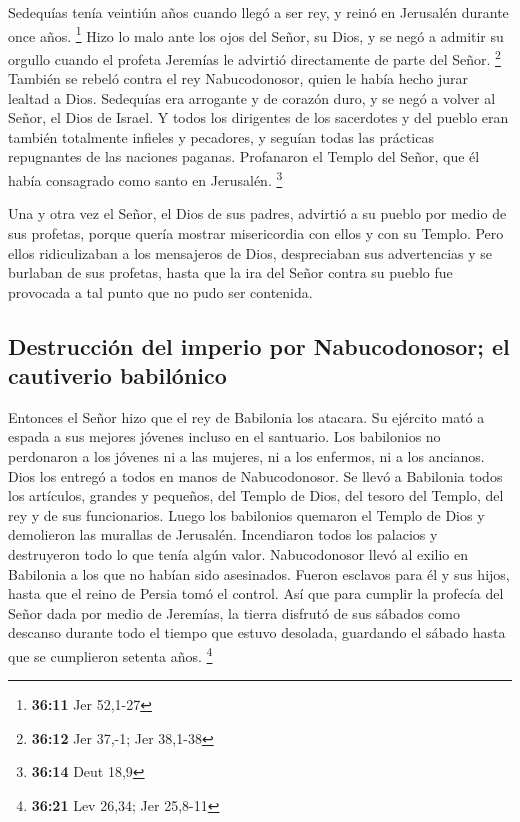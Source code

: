  Sedequías tenía veintiún años cuando llegó a ser rey, y
reinó en Jerusalén durante once años. \footnote{\textbf{36:11} Jer
  52,1-27}  Hizo lo malo ante los ojos del Señor, su
Dios, y se negó a admitir su orgullo cuando el profeta Jeremías le
advirtió directamente de parte del Señor. \footnote{\textbf{36:12} Jer
  37,-1; Jer 38,1-38}  También se rebeló contra el rey
Nabucodonosor, quien le había hecho jurar lealtad a Dios. Sedequías era
arrogante y de corazón duro, y se negó a volver al Señor, el Dios de
Israel.  Y todos los dirigentes de los sacerdotes y del
pueblo eran también totalmente infieles y pecadores, y seguían todas las
prácticas repugnantes de las naciones paganas. Profanaron el Templo del
Señor, que él había consagrado como santo en Jerusalén. \footnote{\textbf{36:14}
  Deut 18,9}

 Una y otra vez el Señor, el Dios de sus padres, advirtió
a su pueblo por medio de sus profetas, porque quería mostrar
misericordia con ellos y con su Templo.  Pero ellos
ridiculizaban a los mensajeros de Dios, despreciaban sus advertencias y
se burlaban de sus profetas, hasta que la ira del Señor contra su pueblo
fue provocada a tal punto que no pudo ser contenida.

\hypertarget{destrucciuxf3n-del-imperio-por-nabucodonosor-el-cautiverio-babiluxf3nico}{%
\subsection{Destrucción del imperio por Nabucodonosor; el cautiverio
babilónico}\label{destrucciuxf3n-del-imperio-por-nabucodonosor-el-cautiverio-babiluxf3nico}}

 Entonces el Señor hizo que el rey de Babilonia los
atacara. Su ejército mató a espada a sus mejores jóvenes incluso en el
santuario. Los babilonios no perdonaron a los jóvenes ni a las mujeres,
ni a los enfermos, ni a los ancianos. Dios los entregó a todos en manos
de Nabucodonosor.  Se llevó a Babilonia todos los
artículos, grandes y pequeños, del Templo de Dios, del tesoro del
Templo, del rey y de sus funcionarios.  Luego los
babilonios quemaron el Templo de Dios y demolieron las murallas de
Jerusalén. Incendiaron todos los palacios y destruyeron todo lo que
tenía algún valor.  Nabucodonosor llevó al exilio en
Babilonia a los que no habían sido asesinados. Fueron esclavos para él y
sus hijos, hasta que el reino de Persia tomó el control. 
Así que para cumplir la profecía del Señor dada por medio de Jeremías,
la tierra disfrutó de sus sábados como descanso durante todo el tiempo
que estuvo desolada, guardando el sábado hasta que se cumplieron setenta
años. \footnote{\textbf{36:21} Lev 26,34; Jer 25,8-11}

